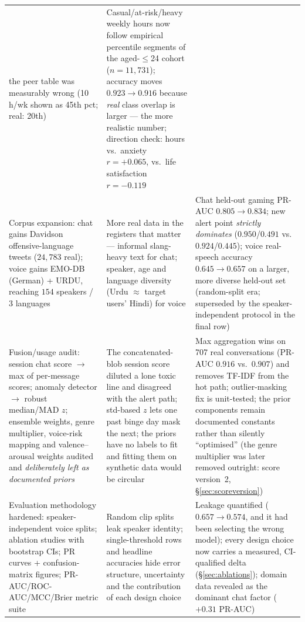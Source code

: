 \documentclass[11pt,a4paper]{article}
\begin{document}
\begin{xltabular}{\linewidth}{p{3.1cm}XX}
the peer table was measurably wrong (10\,h/wk shown as 45th pct; real: 20th) &
Casual/at-risk/heavy weekly hours now follow empirical percentile segments of the
aged-$\leq$24 cohort ($n{=}11{,}731$); accuracy moves $0.923 \rightarrow 0.916$
because \emph{real} class overlap is larger --- the more realistic number; direction
check: hours vs.\ anxiety $r{=}{+}0.065$, vs.\ life satisfaction $r{=}{-}0.119$ \\
\addlinespace
Corpus expansion: chat gains Davidson offensive-language tweets ($24{,}783$ real);
voice gains EMO-DB (German) + URDU, reaching $154$ speakers / 3 languages &
More real data in the registers that matter --- informal slang-heavy text for chat;
speaker, age and language diversity (Urdu $\approx$ target users' Hindi) for voice &
Chat held-out gaming PR-AUC $0.805 \rightarrow 0.834$; new alert point
\emph{strictly dominates} ($0.950$/$0.491$ vs.\ $0.924$/$0.445$); voice real-speech
accuracy $0.645 \rightarrow 0.657$ on a larger, more diverse held-out set
(random-split era; superseded by the speaker-independent protocol in the final row) \\
\addlinespace
Fusion/usage audit: session chat score $\rightarrow$ max of per-message scores;
anomaly detector $\rightarrow$ robust median/MAD $z$; ensemble weights, genre
multiplier, voice-risk mapping and valence--arousal weights audited and
\emph{deliberately left as documented priors} &
The concatenated-blob session score diluted a lone toxic line and disagreed with the
alert path; std-based $z$ lets one past binge day mask the next; the priors have no
labels to fit and fitting them on synthetic data would be circular &
Max aggregation wins on 707 real conversations (PR-AUC $0.916$ vs.\ $0.907$) and
removes TF-IDF from the hot path; outlier-masking fix is unit-tested; the prior
components remain documented constants rather than silently ``optimised'' (the
genre multiplier was later removed outright: score version~2,
\S\ref{sec:scoreversion}) \\
\addlinespace
Evaluation methodology hardened: speaker-independent voice splits; ablation studies
with bootstrap CIs; PR curves + confusion-matrix figures; PR-AUC/ROC-AUC/MCC/Brier
metric suite &
Random clip splits leak speaker identity; single-threshold rows and headline
accuracies hide error structure, uncertainty and the contribution of each design
choice &
Leakage quantified ($0.657 \rightarrow 0.574$, and it had been selecting the wrong
model); every design choice now carries a measured, CI-qualified delta
(\S\ref{sec:ablations}); domain data revealed as the dominant chat factor
($+0.31$ PR-AUC) \\
\end{xltabular}
\end{document}
